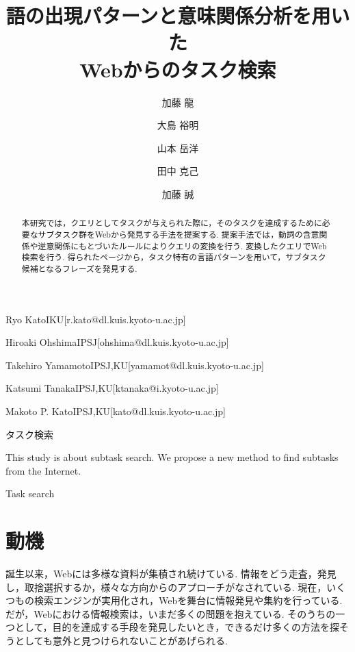 \documentclass[submit,techreq]{ipsj}
\begin{document}
\title{語の出現パターンと意味関係分析を用いた\\
Webからのタスク検索}







\author{加藤 龍}{Ryo Kato}{IKU}[r.kato@dl.kuis.kyoto-u.ac.jp]
\author{大島 裕明}{Hiroaki Ohshima}{IPSJ}[ohshima@dl.kuis.kyoto-u.ac.jp]
\author{山本 岳洋}{Takehiro Yamamoto}{IPSJ,KU}[yamamot@dl.kuis.kyoto-u.ac.jp]
\author{田中 克己}{Katsumi Tanaka}{IPSJ,KU}[ktanaka@i.kyoto-u.ac.jp]
\author{加藤 誠}{Makoto P. Kato}{IPSJ,KU}[kato@dl.kuis.kyoto-u.ac.jp]

\begin{abstract}
本研究では，クエリとしてタスクが与えられた際に，そのタスクを達成するために必要なサブタスク群をWebから発見する手法を提案する. 提案手法では，動詞の含意関係や逆意関係にもとづいたルールによりクエリの変換を行う. 変換したクエリでWeb検索を行う. 得られたページから，タスク特有の言語パターンを用いて，サブタスク候補となるフレーズを発見する. 
\end{abstract}

\begin{jkeyword}
タスク検索
\end{jkeyword}

\begin{eabstract}
This study is about subtask search. We propose a new method to find subtasks from the Internet.
\end{eabstract}

\begin{ekeyword}
Task search
\end{ekeyword}

\maketitle

\section{動機}

誕生以来，Webには多様な資料が集積され続けている. 情報をどう走査，発見し，取捨選択するか，様々な方向からのアプローチがなされている. 
現在，いくつもの検索エンジンが実用化され，Webを舞台に情報発見や集約を行っている. だが，Webにおける情報検索は，いまだ多くの問題を抱えている. 
そのうちの一つとして，目的を達成する手段を発見したいとき，できるだけ多くの方法を探そうとしても意外と見つけられないことがあげられる.
\end{document}
